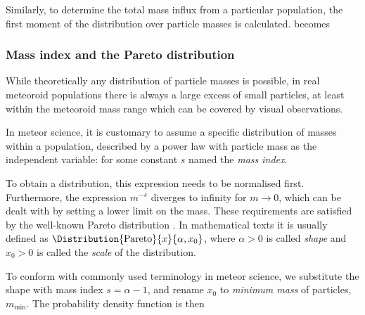             Similarly, to determine the total mass influx from a particular population, the first moment
            of the distribution over particle masses is calculated.
             becomes

        \subsubsection{Mass index and the Pareto distribution} \label{msms}
            While theoretically any distribution of particle masses is possible,
            in real meteoroid populations there is always a large excess of small particles,
            at least within the meteoroid mass range which can be covered by visual observations.

            In meteor science, it is customary to assume a specific distribution of masses within a population,
            described by a power law with particle mass as the independent variable:
            for some constant $s$ named the \emph{mass index}.

            To obtain a distribution, this expression needs to be normalised first.
            Furthermore, the expression $m^{-s}$ diverges to infinity for $m \to 0$,
            which can be dealt with by setting a lower limit on the mass.
            These requirements are satisfied by the well-known Pareto distribution \citep{arnold1983}.
            In mathematical texts it is usually defined as $\Distribution{\mathrm{Pareto}}{x}{\alpha, x_0}$,
            where $\alpha > 0$ is called \emph{shape} and $x_0 > 0$ is called the \emph{scale} of the distribution.

            To conform with commonly used terminology in meteor science, we substitute the shape with mass index
            $s = \alpha - 1$, and rename $x_0$ to \emph{minimum mass} of particles, $m_\mathrm{min}$.
            The probability density function is then


